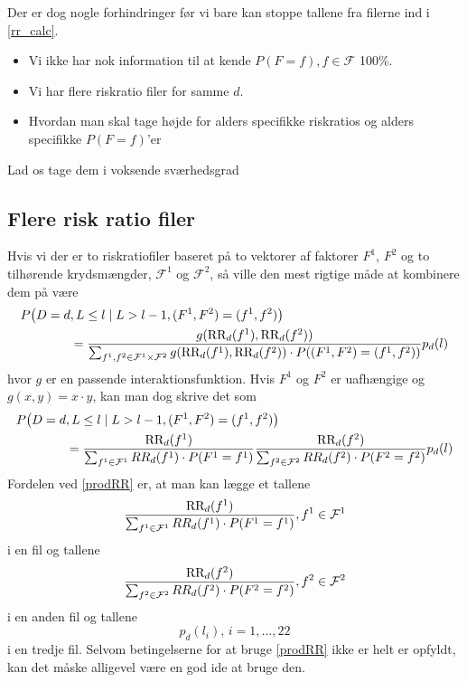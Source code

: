 \documentclass[a4paper, 12pt]{memoir}
\begin{document}
Der er dog nogle forhindringer før vi bare kan stoppe tallene fra filerne ind i \eqref{rr_calc}.
\begin{itemize}
\item
Vi ikke har nok information til at kende $P(F=f), f\in \mathcal F$ 100\%.
\item
Vi har flere riskratio filer for samme $d$. 
\item
Hvordan man skal tage højde for alders specifikke riskratios og alders specifikke $P(F=f)$'er
\end{itemize}
Lad os tage dem i voksende sværhedsgrad

\subsection{Flere risk ratio filer}
Hvis vi der er to riskratiofiler baseret på to vektorer af faktorer $F^1$, $F^2$ og to tilhørende krydsmængder, $\mathcal F^1$ og $\mathcal F^2$, så ville den mest rigtige måde at kombinere dem på være
\begin{align}
P\bigl(D=d&, L\leq l \mid L>l-1, (F^1,F^2)=(f^1,f^2)\bigr)\label{trueRR}\\
&=\frac{g(\textup{RR}_{d}(f^1),\textup{RR}_{d}(f^2))}{\sum_{f^1,f^2\in \mathcal F^1\times \mathcal F^2} g(\textup{RR}_{d}(f^1),\textup{RR}_{d}(f^2))\cdot P((F^1,F^2)=(f^1,f^2))}p_d(l)\nonumber
\end{align}
hvor $g$ er en passende interaktionsfunktion. Hvis $F^1$ og $F^2$ er uafhængige og $g(x,y)=x\cdot y$, kan man dog skrive det som
\begin{align}
P\bigl(D=d&, L\leq l \mid L>l-1, (F^1,F^2)=(f^1,f^2)\bigr)\label{prodRR}\\
&=\frac{\textup{RR}_{d}(f^1)}{\sum_{f^1\in \mathcal F^1} RR_d(f^1)\cdot P(F^1=f^1)}\frac{\textup{RR}_{d}(f^2)}{\sum_{f^2\in \mathcal F^2} RR_d(f^2)\cdot P(F^2=f^2)}p_d(l)\nonumber
\end{align}
Fordelen ved \eqref{prodRR} er, at man kan lægge et tallene 
\begin{equation*}
\frac{\textup{RR}_{d}(f^1)}{\sum_{f^1\in \mathcal F^1} RR_d(f^1)\cdot P(F^1=f^1)}, f^1\in \mathcal F^1
\end{equation*}
i en fil og tallene
\begin{equation*}
\frac{\textup{RR}_{d}(f^2)}{\sum_{f^2\in \mathcal F^2} RR_d(f^2)\cdot P(F^2=f^2)}, f^2\in \mathcal F^2
\end{equation*}
i en anden fil og tallene
\begin{equation*}
p_d(l_i), \, i=1, \dots, 22
\end{equation*}
i en tredje fil. Selvom betingelserne for at bruge \eqref{prodRR} ikke er helt er opfyldt, kan det måske alligevel være en god ide at bruge den. 
\end{document}
